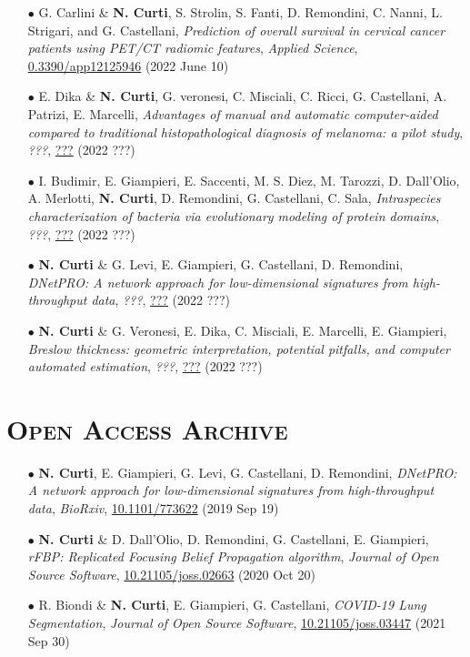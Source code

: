 \documentclass[a4paper,11pt]{article}
\begin{document}
\begin{itemize}
  \item[$\bullet$] G. Carlini \& \textbf{N. Curti}, S. Strolin, S. Fanti, D. Remondini, C. Nanni, L. Strigari, and G. Castellani, \emph{Prediction of overall survival in cervical cancer patients using PET/CT radiomic features}, \emph{Applied Science}, \url{0.3390/app12125946} (2022 June 10)

  \item[$\bullet$] E. Dika \& \textbf{N. Curti}, G. veronesi, C. Misciali, C. Ricci, G. Castellani, A. Patrizi, E. Marcelli, \emph{Advantages of manual and automatic computer-aided compared to traditional histopathological diagnosis of melanoma: a pilot study}, \emph{???}, \url{???} (2022 ???)

  \item[$\bullet$] I. Budimir, E. Giampieri, E. Saccenti, M. S. Diez, M. Tarozzi, D. Dall'Olio, A. Merlotti, \textbf{N. Curti}, D. Remondini, G. Castellani, C. Sala, \emph{Intraspecies characterization of bacteria via evolutionary modeling of protein domains}, \emph{???}, \url{???} (2022 ???)

  \item[$\bullet$] \textbf{N. Curti} \& G. Levi, E. Giampieri, G. Castellani, D. Remondini, \emph{DNetPRO: A network approach for low-dimensional signatures from high-throughput data}, \emph{???}, \url{???} (2022 ???)

  \item[$\bullet$] \textbf{N. Curti} \& G. Veronesi, E. Dika, C. Misciali, E. Marcelli, E. Giampieri, \emph{Breslow thickness: geometric interpretation, potential pitfalls, and computer automated estimation}, \emph{???}, \url{???} (2022 ???)

\end{itemize}

\vspace*{0.5cm}
\section*{\scshape{Open Access Archive}}

\begin{itemize}

  \item[$\bullet$] \textbf{N. Curti}, E. Giampieri, G. Levi, G. Castellani, D. Remondini, \emph{DNetPRO: A network approach for low-dimensional signatures from high-throughput data}, \emph{BioRxiv}, \url{10.1101/773622} (2019 Sep 19)

  \item[$\bullet$] \textbf{N. Curti} \& D. Dall'Olio, D. Remondini, G. Castellani, E. Giampieri, \emph{rFBP: Replicated Focusing Belief Propagation algorithm}, \emph{Journal of Open Source Software}, \url{10.21105/joss.02663} (2020 Oct 20)

  \item[$\bullet$] R. Biondi \& \textbf{N. Curti}, E. Giampieri, G. Castellani, \emph{COVID-19 Lung Segmentation}, \emph{Journal of Open Source Software}, \url{10.21105/joss.03447} (2021 Sep 30)

\end{itemize}
\end{document}
